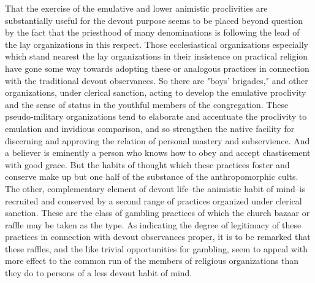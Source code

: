 \documentclass[12pt]{report}
\begin{document}
That the exercise of the emulative and lower animistic proclivities are
substantially useful for the devout purpose seems to be placed beyond
question by the fact that the priesthood of many denominations is
following the lead of the lay organizations in this respect. Those
ecclesiastical organizations especially which stand nearest the lay
organizations in their insistence on practical religion have gone some
way towards adopting these or analogous practices in connection with the
traditional devout observances. So there are "boys' brigades," and other
organizations, under clerical sanction, acting to develop the emulative
proclivity and the sense of status in the youthful members of the
congregation. These pseudo-military organizations tend to elaborate and
accentuate the proclivity to emulation and invidious comparison, and so
strengthen the native facility for discerning and approving the relation
of personal mastery and subservience. And a believer is eminently a
person who knows how to obey and accept chastisement with good grace.
But the habits of thought which these practices foster and conserve
make up but one half of the substance of the anthropomorphic cults.
The other, complementary element of devout life--the animistic habit
of mind--is recruited and conserved by a second range of practices
organized under clerical sanction. These are the class of gambling
practices of which the church bazaar or raffle may be taken as the type.
As indicating the degree of legitimacy of these practices in connection
with devout observances proper, it is to be remarked that these raffles,
and the like trivial opportunities for gambling, seem to appeal with
more effect to the common run of the members of religious organizations
than they do to persons of a less devout habit of mind.
\end{document}
